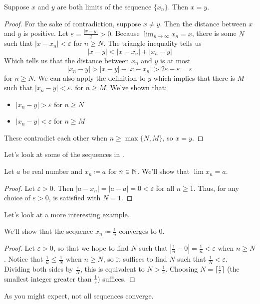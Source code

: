 \documentclass[../notes.tex]{subfiles}
\begin{document}
\begin{proposition} \label{prop:seq-limit-uniq}
    Suppose $x$ and $y$ are both limits of the sequence $\{x_n\}$. Then $x=y$. 
\end{proposition}
\begin{proof}
    For the sake of contradiction, suppose $x\neq y$. Then the distance between $x$ and $y$ is positive. Let $\varepsilon=\frac{|x-y|}{2}>0$. Because $\lim_{n\to \infty}x_n = x$, there is some $N$ such that $|x-x_n| < \varepsilon$ for $n\geq N$. 
    The triangle inequality tells us
    \[ |x-y| < |x-x_n|+|x_n-y| \]
    Which tells us that the distance between $x_n$ and $y$ is at most
    \[ |x_n - y| > |x-y|-|x-x_n| > 2\varepsilon - \varepsilon = \varepsilon\]
    for $n\geq N$. We can also apply the definition to $y$ which implies that there is $M$ such that $|x_n - y| < \varepsilon$. for $n\geq M$. We've shown that:
    \begin{itemize}
        \item $|x_n - y| > \varepsilon$ for $n\geq N$
        \item $|x_n -y| < \varepsilon$ for $n\geq M$
    \end{itemize}
    These contradict each other when $n\geq \max\{N, M\}$, so $x=y$.  
\end{proof}

Let's look at some of the sequences in .

\begin{example}
    Let $a$ be real number and $x_n\coloneqq a$ for $n\in\mathbb N$. We'll show that $\lim x_n = a$.
\end{example}
\begin{proof}
    Let $\varepsilon>0$. Then $|a-x_n|=|a-a|=0 <\varepsilon$ for all $n\geq 1$. Thus, for any choice of $\varepsilon>0$,  is satisfied with $N=1$. 
\end{proof}
Let's look at a more interesting example. 

\begin{example}
    We'll show that the sequence $x_n\coloneqq\frac{1}{n}$ converges to $0$.
\end{example}
\begin{proof}
    Let $\varepsilon>0$, so that we hope to find $N$ such that $|\frac{1}{n}-0|=\frac{1}{n}<\varepsilon$ when $n\geq N$. Notice that $\frac{1}{n}\leq \frac{1}{N}$ when $n\geq N$, so it suffices to find $N$ such that $\frac{1}{N}<\varepsilon$. Dividing both sides by $\frac{\varepsilon}{N}$, this is equivalent to $N > \frac{1}{\varepsilon}$. Choosing $N=\lceil \frac{1}{\varepsilon}\rceil$ (the smallest integer greater than $\frac{1}{\varepsilon}$) suffices.
\end{proof}
As you might expect, not all sequences converge.
\end{document}
